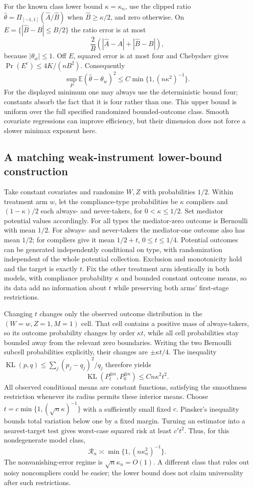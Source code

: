 \documentclass[11pt]{article}
\newcommand{\E}{\mathbb E}
\begin{document}
For the known class lower bound $\kappa=\kappa_n$, use the clipped ratio
$\widehat\theta=\Pi_{[-1,1]}(\widehat A/\widehat B)$ when
$\widehat B\geq\kappa/2$, and zero otherwise. On
$E=\{|\widehat B-B|\leq B/2\}$ the ratio error is at most
\[
 \frac{2}{B}(|\widehat A-A|+|\widehat B-B|),
\]
because $|\theta_w|\leq1$. Off $E$, squared error is at most four and
Chebyshev gives $\Pr(E^c)\leq4K/(nB^2)$. Consequently
\[
 \sup_P\E(\widehat\theta-\theta_w)^2
 \leq C\min\{1,(n\kappa^2)^{-1}\}.
\]
For the displayed minimum one may always use the deterministic bound four;
constants absorb the fact that it is four rather than one. This upper
bound is uniform over the full specified randomized bounded-outcome class.
Smooth covariate regressions can improve efficiency, but their dimension
does not force a slower minimax exponent here.

\subsection*{A matching weak-instrument lower-bound construction}
Take constant covariates and randomize $W,Z$ with probabilities $1/2$.
Within treatment arm $w$, let the compliance-type probabilities be
$\kappa$ compliers and $(1-\kappa)/2$ each always- and never-takers,
for $0<\kappa\leq1/2$. Set mediator potential values accordingly.
For all types the mediator-zero outcome is Bernoulli with mean $1/2$.
For always- and never-takers the mediator-one outcome also has mean $1/2$;
for compliers give it mean $1/2+t$, $0\leq t\leq1/4$.
Potential outcomes can be generated independently conditional on type,
with randomization independent of the whole potential collection.
Exclusion and monotonicity hold and the target is exactly $t$.
Fix the other treatment arm identically in both models, with compliance
probability $\kappa$ and bounded constant outcome means, so its data add
no information about $t$ while preserving both arms' first-stage restrictions.

Changing $t$ changes only the observed outcome distribution in the
$(W=w,Z=1,M=1)$ cell. That cell contains a positive mass of always-takers,
so its outcome probability changes by order $\kappa t$, while all cell
probabilities stay bounded away from the relevant zero boundaries.
Writing the two Bernoulli subcell probabilities explicitly, their changes
are $\pm\kappa t/4$. The inequality
$\operatorname{KL}(p,q)\leq\sum_j(p_j-q_j)^2/q_j$ therefore yields
\[
 \operatorname{KL}(P_t^{\otimes n},P_0^{\otimes n})
 \leq Cn\kappa^2t^2.
\]
All observed conditional means are constant functions, satisfying the
smoothness restriction whenever its radius permits these interior means.
Choose $t=c\min\{1,(\sqrt n\kappa)^{-1}\}$ with a sufficiently small
fixed $c$. Pinsker's inequality bounds total variation below one by a fixed
margin. Turning an estimator into a nearest-target test gives worst-case
squared risk at least $c' t^2$. Thus, for this nondegenerate model class,
\[
 \mathcal R_n\asymp\min\{1,(n\kappa_n^2)^{-1}\}.
\]
The nonvanishing-error regime is $\sqrt n\kappa_n=O(1)$. A different class
that rules out noisy noncompliers could be easier; the lower bound does
not claim universality after such restrictions.
\end{document}
